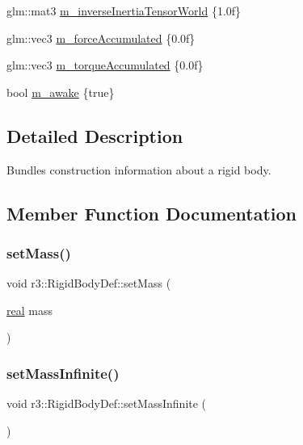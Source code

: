 \begin{DoxyCompactItemize}
\item 
glm\+::mat3 \mbox{\hyperlink{structr3_1_1_rigid_body_def_acf08b5556bde4c822264a7dc6c180e90}{m\+\_\+inverse\+Inertia\+Tensor\+World}} \{1.\+0f\}
\item 
glm\+::vec3 \mbox{\hyperlink{structr3_1_1_rigid_body_def_ae3b46fdab5cf6b6d6724794a1d3b3cdb}{m\+\_\+force\+Accumulated}} \{0.\+0f\}
\item 
glm\+::vec3 \mbox{\hyperlink{structr3_1_1_rigid_body_def_ab12c90dd6547748d3d7f27e53833a9e6}{m\+\_\+torque\+Accumulated}} \{0.\+0f\}
\item 
bool \mbox{\hyperlink{structr3_1_1_rigid_body_def_a3d48ea179d5ebc3a906949a623236c5a}{m\+\_\+awake}} \{true\}
\end{DoxyCompactItemize}


\subsection{Detailed Description}
Bundles construction information about a rigid body. 

\subsection{Member Function Documentation}
\mbox{\label{structr3_1_1_rigid_body_def_a7b84fd988312a41f84ac0505f6c3de47}} 
\subsubsection{\texorpdfstring{set\+Mass()}{setMass()}}
{\footnotesize\ttfamily void r3\+::\+Rigid\+Body\+Def\+::set\+Mass (\begin{DoxyParamCaption}\item[{\mbox{\hyperlink{namespacer3_ab2016b3e3f743fb735afce242f0dc1eb}{real}}}]{mass }\end{DoxyParamCaption})}

\mbox{\label{structr3_1_1_rigid_body_def_a6912018eac59c46be887cf07e7aadc36}} 
\subsubsection{\texorpdfstring{set\+Mass\+Infinite()}{setMassInfinite()}}
{\footnotesize\ttfamily void r3\+::\+Rigid\+Body\+Def\+::set\+Mass\+Infinite (\begin{DoxyParamCaption}{ }\end{DoxyParamCaption})}



